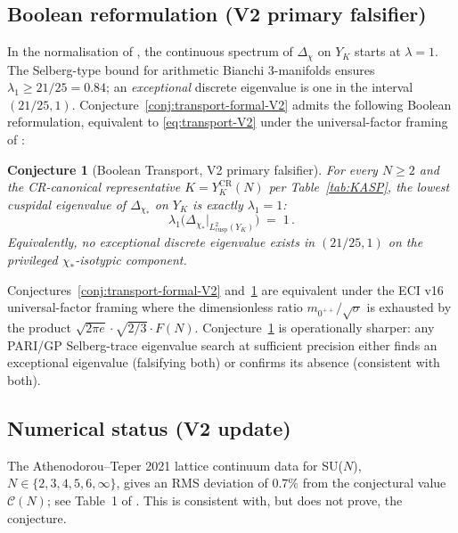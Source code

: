 \documentclass[11pt,a4paper,reqno]{amsart}
\newtheorem{conjecture}[theorem]{Conjecture}
\theoremstyle{definition}
\newcommand{\YK}{Y_K}
\newcommand{\YKCR}{Y_K^{\mathrm{CR}}}
\begin{document}
\subsection{Boolean reformulation (V2 primary falsifier)}\label{ss:boolean-falsifier}

In the normalisation of \cite[\S\S6.1, 7.4]{ElstrodtGrunewaldMennicke1998}, the continuous spectrum of $\Delta_\chi$ on $\YK$ starts at $\lambda = 1$. The Selberg-type bound for arithmetic Bianchi 3-manifolds \cite{Sarnak1983} ensures $\lambda_1\ge 21/25 = 0.84$; an \emph{exceptional} discrete eigenvalue is one in the interval $(21/25, 1)$. Conjecture~\ref{conj:transport-formal-V2} admits the following Boolean reformulation, equivalent to \eqref{eq:transport-V2} under the universal-factor framing of \cite{Remondiere2026RouteB}:

\begin{conjecture}[Boolean Transport, V2 primary falsifier]\label{conj:boolean}
For every $N\ge 2$ and the CR-canonical representative $K = \YKCR(N)$ per Table~\ref{tab:KASP}, the lowest cuspidal eigenvalue of $\Delta_{\chi_*}$ on $\YK$ is exactly $\lambda_1 = 1$:
\begin{equation}\label{eq:boolean-falsifier}
   \lambda_1\bigl(\Delta_{\chi_*}\big|_{L^2_{\mathrm{cusp}}(\YK)}\bigr) \;=\; 1\,.
\end{equation}
Equivalently, no exceptional discrete eigenvalue exists in $(21/25, 1)$ on the privileged $\chi_*$-isotypic component.
\end{conjecture}

Conjectures~\ref{conj:transport-formal-V2} and~\ref{conj:boolean} are equivalent under the ECI v16 universal-factor framing where the dimensionless ratio $m_{0^{++}}/\sqrt{\sigma}$ is exhausted by the product $\sqrt{2\pi e}\cdot\sqrt{2/3}\cdot F(N)$. Conjecture~\ref{conj:boolean} is operationally sharper: any PARI/GP Selberg-trace eigenvalue search at sufficient precision either finds an exceptional eigenvalue (falsifying both) or confirms its absence (consistent with both).

\subsection{Numerical status (V2 update)}\label{ss:numeric}

The Athenodorou--Teper 2021 lattice continuum data \cite[Tab.~34]{AthenodorouTeper2021} for SU($N$), $N\in\{2,3,4,5,6,\infty\}$, gives an RMS deviation of $0.7\%$ from the conjectural value $\mathcal{C}(N)$; see Table~1 of \cite{Remondiere2026RouteB}. This is consistent with, but does not prove, the conjecture.
\end{document}
